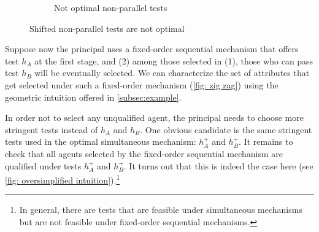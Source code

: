 \begin{figure}
\begin{subfigure}{0.45\textwidth}
 \caption{Not optimal non-parallel tests}  
 \end{subfigure}
 \caption{Shifted non-parallel tests are not optimal}
 \label{fig:non-parallel tests not optimal}
\end{figure}

Suppose now the principal uses a fixed-order sequential mechanism that offers test $h_{A}$ at the first stage, and (2) among those
selected in (1), those who can pass test $h_{B}$ will be eventually
selected. We can characterize the set of attributes that get selected under such a fixed-order mechanism (\cref{fig: zig zag}) using the geometric intuition offered in \cref{subsec:example}.

In order not to select any unqualified agent, the principal needs to choose
more stringent tests instead of $h_{A}$ and $h_{B}$. One obvious candidate is the same stringent tests used in the optimal simultaneous mechanism: $%
h_{A}^{+}$ and $h_{B}^{+}$.
It remains to check that all agents selected by the fixed-order sequential mechanism are qualified under tests $%
h_{A}^{+}$ and $h_{B}^{+}$.
It turns out that this is indeed the case here (see \cref{fig: oversimplified intuition}).\footnote{In general, there are tests that are feasible under simultaneous mechanisms but are not feasible under fixed-order sequential mechanisms.}


